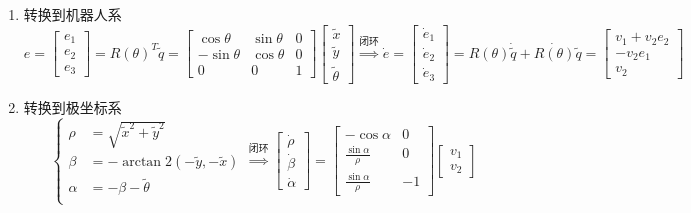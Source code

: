 \documentclass[
12pt, %
a4paper, 
oneside, %
headinclude,footinclude, %
]{scrartcl}
\begin{document}
\begin{enumerate}
\item 转换到机器人系
$$ 
e = \begin{bmatrix} e_1 \\ e_2 \\ e_3 \end{bmatrix} = R(\theta)^T \tilde{q} = \begin{bmatrix} \cos\theta & \sin\theta & 0 \\ -\sin\theta & \cos\theta & 0 \\ 0 & 0 & 1 \end{bmatrix} \begin{bmatrix} \tilde{x} \\ \tilde{y} \\ \tilde{\theta} \end{bmatrix}
\overset{\text{闭环}}{\Longrightarrow}
\dot{e} = \begin{bmatrix} \dot{e}_1 \\ \dot{e}_2 \\ \dot{e}_3 \end{bmatrix} = R(\theta)\dot{\tilde{q}} + \dot{R(\theta)}\tilde{q} = \begin{bmatrix} v_1 + v_2 e_2 \\ -v_2 e_1 \\ v_2 \end{bmatrix} 
$$
\item 转换到极坐标系
$$ 
\begin{cases}
\rho &= \sqrt{\tilde{x}^2 + \tilde{y}^2} \\
\beta &= -\arctan2(-\tilde{y},-\tilde{x}) \\
\alpha &= -\beta - \tilde{\theta} \\
\end{cases}
\overset{\text{闭环}}{\Longrightarrow}
\begin{bmatrix} \dot{\rho} \\ \dot{\beta} \\ \dot{\alpha} \end{bmatrix} = 
\begin{bmatrix} -\cos\alpha & 0 \\ \frac{\sin\alpha}{\rho} & 0 \\ \frac{\sin\alpha}{\rho} & -1 \end{bmatrix}
\begin{bmatrix} v_1 \\ v_2 \end{bmatrix}
$$ 
\end{enumerate}
\end{document}
